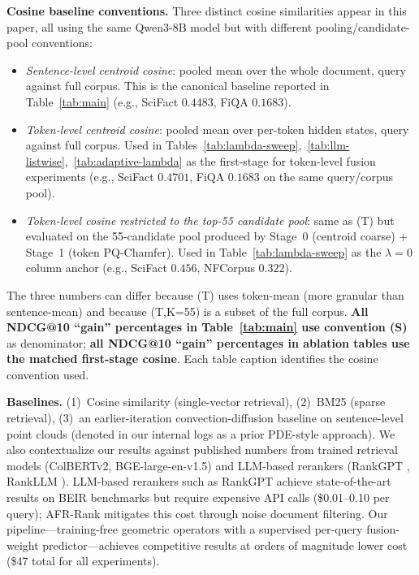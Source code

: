 \documentclass[review,1p]{elsarticle}
\begin{document}
\textbf{Cosine baseline conventions.} Three distinct cosine similarities appear in this paper, all using the same Qwen3-8B model but with different pooling/candidate-pool conventions:
\begin{itemize}
\item[(S)] \emph{Sentence-level centroid cosine}: pooled mean over the whole document, query against full corpus. This is the canonical baseline reported in Table~\ref{tab:main} (e.g., SciFact $0.4483$, FiQA $0.1683$).
\item[(T)] \emph{Token-level centroid cosine}: pooled mean over per-token hidden states, query against full corpus. Used in Tables~\ref{tab:lambda-sweep},~\ref{tab:llm-listwise},~\ref{tab:adaptive-lambda} as the first-stage for token-level fusion experiments (e.g., SciFact $0.4701$, FiQA $0.1683$ on the same query/corpus pool).
\item[(T,K=55)] \emph{Token-level cosine restricted to the top-55 candidate pool}: same as (T) but evaluated on the 55-candidate pool produced by Stage~0 (centroid coarse) + Stage~1 (token PQ-Chamfer). Used in Table~\ref{tab:lambda-sweep} as the $\lambda=0$ column anchor (e.g., SciFact $0.456$, NFCorpus $0.322$).
\end{itemize}
The three numbers can differ because (T) uses token-mean (more granular than sentence-mean) and because (T,K=55) is a subset of the full corpus. \textbf{All NDCG@10 ``gain'' percentages in Table~\ref{tab:main} use convention (S)} as denominator; \textbf{all NDCG@10 ``gain'' percentages in ablation tables use the matched first-stage cosine}. Each table caption identifies the cosine convention used.

\textbf{Baselines.} (1)~Cosine similarity (single-vector retrieval), (2)~BM25 (sparse retrieval), (3)~an earlier-iteration convection-diffusion baseline on sentence-level point clouds (denoted in our internal logs as a prior PDE-style approach). We also contextualize our results against published numbers from trained retrieval models (ColBERTv2, BGE-large-en-v1.5) and LLM-based rerankers (RankGPT \citep{sun2024rankgpt}, RankLLM \citep{pradeep2025rankllm}). LLM-based rerankers such as RankGPT achieve state-of-the-art results on BEIR benchmarks but require expensive API calls (\$0.01--0.10 per query); AFR-Rank \citep{afrrank2025} mitigates this cost through noise document filtering. Our pipeline---training-free geometric operators with a supervised per-query fusion-weight predictor---achieves competitive results at orders of magnitude lower cost (\$47 total for all experiments).
\end{document}
